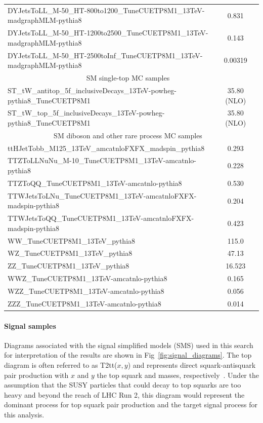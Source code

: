 \begin{table}[hp]
{\begin{tabular}{lcc}
DYJetsToLL\_M-50\_HT-800to1200\_TuneCUETP8M1\_13TeV-madgraphMLM-pythia8 & 0.831 \\
DYJetsToLL\_M-50\_HT-1200to2500\_TuneCUETP8M1\_13TeV-madgraphMLM-pythia8 & 0.143 \\
DYJetsToLL\_M-50\_HT-2500toInf\_TuneCUETP8M1\_13TeV-madgraphMLM-pythia8 & 0.00319 \\
\hline
\multicolumn{2}{c}{SM single-top MC samples} \\ \hline
ST\_tW\_antitop\_5f\_inclusiveDecays\_13TeV-powheg-pythia8\_TuneCUETP8M1 & 35.80 (NLO) \\
ST\_tW\_top\_5f\_inclusiveDecays\_13TeV-powheg-pythia8\_TuneCUETP8M1 & 35.80 (NLO) \\
\hline
\multicolumn{2}{c}{SM diboson and other rare process MC samples} \\ \hline
ttHJetTobb\_M125\_13TeV\_amcatnloFXFX\_madspin\_pythia8 & 0.293 \\
TTZToLLNuNu\_M-10\_TuneCUETP8M1\_13TeV-amcatnlo-pythia8 & 0.228 \\
TTZToQQ\_TuneCUETP8M1\_13TeV-amcatnlo-pythia8 & 0.530 \\
TTWJetsToLNu\_TuneCUETP8M1\_13TeV-amcatnloFXFX-madspin-pythia8 & 0.204 \\
TTWJetsToQQ\_TuneCUETP8M1\_13TeV-amcatnloFXFX-madspin-pythia8 & 0.423 \\
WW\_TuneCUETP8M1\_13TeV\_pythia8 & 115.0 \\
WZ\_TuneCUETP8M1\_13TeV\_pythia8 & 47.13 \\
ZZ\_TuneCUETP8M1\_13TeV\_pythia8 & 16.523 \\
WWZ\_TuneCUETP8M1\_13TeV-amcatnlo-pythia8 & 0.165 \\
WZZ\_TuneCUETP8M1\_13TeV-amcatnlo-pythia8 & 0.056 \\
ZZZ\_TuneCUETP8M1\_13TeV-amcatnlo-pythia8 & 0.014 \\
\hline \hline
\end{tabular}
}
\end{table}

\paragraph{Signal samples}

Diagrams associated with the signal simplified models (SMS) used in this search for interpretation of the results are shown in Fig~\ref{fig:signal_diagrams}. The top diagram is often referred to as T2tt($x,y$) and represents direct squark-antisquark pair production with $x$ and $y$ the top squark and \chiOneZero masses, respectively~\cite{CMS-SMS-paper}. Under the assumption that the SUSY particles that could decay to top squarks are too heavy and beyond the reach of LHC Run 2, this diagram would represent the dominant process for top squark pair production and the target signal process for this analysis.


